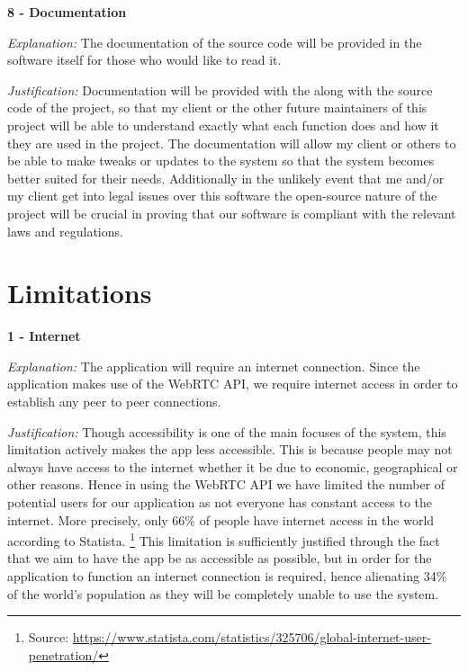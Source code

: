 \textsf{\bfseries 8 - Documentation} \\ \vspace{0.1cm}

\textit{Explanation:}
The documentation of the source code will be provided in the
software itself for those who would like to read it.
\vspace{0.1cm}

\textit{Justification:}
Documentation will be provided with the along with the source code
of the project, so that my client or the other future maintainers
of this project will be able to understand exactly what each
function does and how it they are used in the project. The
documentation will allow my client or others to be able to make
tweaks or updates to the system so that the system becomes better
suited for their needs. Additionally in the unlikely event that me
and/or my client get into legal issues over this software the
open-source nature of the project will be crucial in proving that
our software is compliant with the relevant laws and regulations.

\section{Limitations}
\label{sec:limitations}

\textsf{\bfseries 1 - Internet} \\ \vspace{0.1cm}

\textit{Explanation:}
The application will require an internet connection. Since the
application makes use of the WebRTC API, we require internet
access in order to establish any peer to peer connections.
\vspace{0.1cm}

\textit{Justification:}
Though accessibility is one of the main focuses of the system,
this limitation actively makes the app less accessible. This
is because people may not always have access to the internet
whether it be due to economic, geographical or other reasons.
Hence in using the WebRTC API we have limited the number of
potential users for our application as not everyone has
constant access to the internet. More precisely, only 66\% of
people have internet access in the world according to Statista.
\footnote{Source: \url{https://www.statista.com/statistics/325706/global-internet-user-penetration/}}
This limitation is sufficiently justified through the fact that
we aim to have the app be as accessible as possible, but in
order for the application to function an internet connection is
required, hence alienating 34\% of the world's population as they
will be completely unable to use the system. \\ \vspace{0.2cm}

